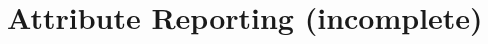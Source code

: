 \hypertarget{group__zcl__reporting}{\section{Attribute Reporting (incomplete)}
\label{group__zcl__reporting}
}
